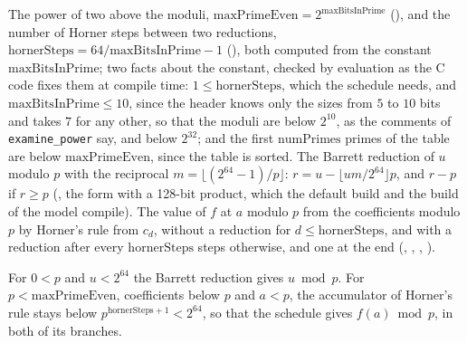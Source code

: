 \begin{definition}\label{def:barrett}
  \leanok
  The power of two above the moduli, $\mathrm{maxPrimeEven} = 2^{\mathrm{maxBitsInPrime}}$
  (), and the number of Horner steps between two reductions,
  $\mathrm{hornerSteps} = 64 / \mathrm{maxBitsInPrime} - 1$ (),
  both computed from the constant $\mathrm{maxBitsInPrime}$; two facts about the constant, checked
  by evaluation as the C code fixes them at compile time: $1 \le \mathrm{hornerSteps}$, which the
  schedule needs, and $\mathrm{maxBitsInPrime} \le 10$, since the header knows only the sizes from
  $5$ to $10$ bits and takes $7$ for any other, so that the moduli are below $2^{10}$, as the
  comments of \verb|examine_power| say, and below $2^{32}$; and the first $\mathrm{numPrimes}$
  primes of the table are below $\mathrm{maxPrimeEven}$, since the table is sorted. The Barrett
  reduction of $u$ modulo $p$ with the reciprocal $m = \lfloor (2^{64} - 1) / p \rfloor$:
  $r = u - \lfloor u m / 2^{64} \rfloor p$, and $r - p$ if $r \ge p$
  (, the form with a 128-bit product, which the default build and
  the build of the model compile). The value of $f$ at $a$ modulo $p$ from the coefficients modulo
  $p$ by Horner's rule from $c_d$, without a reduction for $d \le \mathrm{hornerSteps}$, and with a
  reduction after every $\mathrm{hornerSteps}$ steps otherwise, and one at the end
  (, ,
  , ).
\end{definition}

\begin{lemma}\label{lem:barrett}
  \leanok
  For $0 < p$ and $u < 2^{64}$ the Barrett reduction gives $u \bmod p$. For
  $p < \mathrm{maxPrimeEven}$, coefficients below $p$ and $a < p$, the accumulator of Horner's rule
  stays below $p^{\mathrm{hornerSteps} + 1} < 2^{64}$, so that the schedule gives $f(a) \bmod p$,
  in both of its branches.
\end{lemma}

